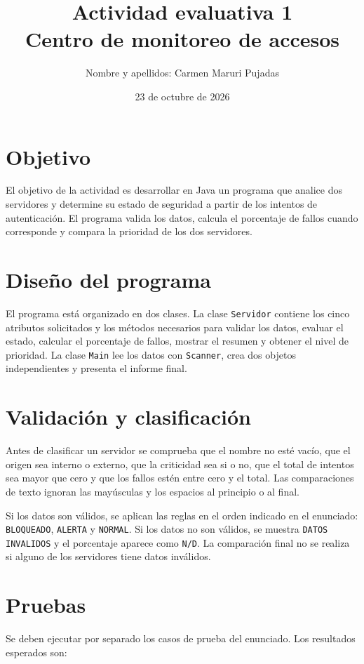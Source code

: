 \documentclass[12pt,a4paper]{article}
\title{Actividad evaluativa 1\\Centro de monitoreo de accesos}
\author{Nombre y apellidos: Carmen Maruri Pujadas\\}
\date{23 de octubre de 2026}
\begin{document}
\maketitle

\section{Objetivo}
El objetivo de la actividad es desarrollar en Java un programa que analice
dos servidores y determine su estado de seguridad a partir de los intentos
de autenticación. El programa valida los datos, calcula el porcentaje de
fallos cuando corresponde y compara la prioridad de los dos servidores.

\section{Diseño del programa}
El programa está organizado en dos clases. La clase \texttt{Servidor}
contiene los cinco atributos solicitados y los métodos necesarios para
validar los datos, evaluar el estado, calcular el porcentaje de fallos,
mostrar el resumen y obtener el nivel de prioridad. La clase \texttt{Main}
lee los datos con \texttt{Scanner}, crea dos objetos independientes y
presenta el informe final.

\section{Validación y clasificación}
Antes de clasificar un servidor se comprueba que el nombre no esté vacío,
que el origen sea interno o externo, que la criticidad sea si o no, que el
total de intentos sea mayor que cero y que los fallos estén entre cero y
el total. Las comparaciones de texto ignoran las mayúsculas y los espacios
al principio o al final.

Si los datos son válidos, se aplican las reglas en el orden indicado en el
enunciado: \texttt{BLOQUEADO}, \texttt{ALERTA} y \texttt{NORMAL}. Si los
datos no son válidos, se muestra \texttt{DATOS INVALIDOS} y el porcentaje
aparece como \texttt{N/D}. La comparación final no se realiza si alguno
de los servidores tiene datos inválidos.

\section{Pruebas}
Se deben ejecutar por separado los casos de prueba del enunciado. Los
resultados esperados son:
\end{document}
